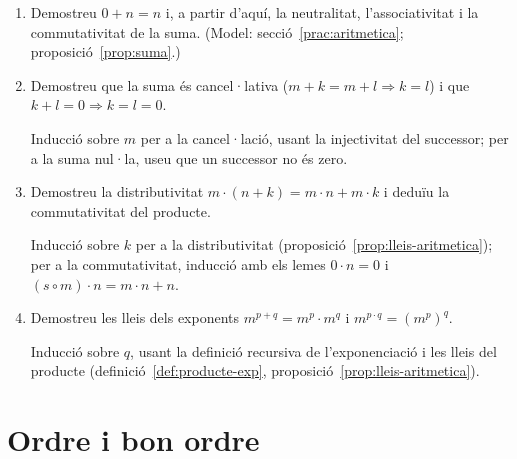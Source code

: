 \begin{enumerate}[resume]
  \item Demostreu \(0+n=n\) i, a partir d'aquí, la neutralitat, l'associativitat i la commutativitat de la suma. (Model: secció~\ref{prac:aritmetica}; proposició~\ref{prop:suma}.)

  \item Demostreu que la suma és cancel·lativa (\(m+k=m+l\Rightarrow k=l\)) i que \(k+l=0\Rightarrow k=l=0\). \begin{indicacio}Inducció sobre \(m\) per a la cancel·lació, usant la injectivitat del successor; per a la suma nul·la, useu que un successor no és zero.\end{indicacio}

  \item Demostreu la distributivitat \(m\cdot(n+k)=m\cdot n+m\cdot k\) i deduïu la commutativitat del producte. \begin{indicacio}Inducció sobre \(k\) per a la distributivitat (proposició~\ref{prop:lleis-aritmetica}); per a la commutativitat, inducció amb els lemes \(0\cdot n=0\) i \((s\circ m)\cdot n=m\cdot n+n\).\end{indicacio}

  \item Demostreu les lleis dels exponents \(m^{p+q}=m^{p}\cdot m^{q}\) i \(m^{p\cdot q}=(m^{p})^{q}\). \begin{indicacio}Inducció sobre \(q\), usant la definició recursiva de l'exponenciació i les lleis del producte (definició~\ref{def:producte-exp}, proposició~\ref{prop:lleis-aritmetica}).\end{indicacio}
\end{enumerate}

\section{Ordre i bon ordre}

